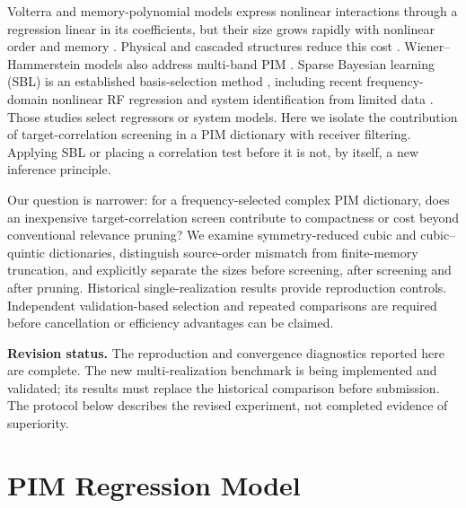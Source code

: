 \documentclass[conference]{IEEEtran}
\begin{document}
Volterra and memory-polynomial models express nonlinear interactions through a regression linear in its coefficients, but their size grows rapidly with nonlinear order and memory \cite{Schetzen1980Volterra,Morgan2006GMP,Waheed2020PIM}. Physical and cascaded structures reduce this cost \cite{Lampu2023Cascade}. Wiener--Hammerstein models also address multi-band PIM \cite{Liu2024MultiBand}. Sparse Bayesian learning (SBL) is an established basis-selection method \cite{Tipping2001SBL,Wipf2004SBL}, including recent frequency-domain nonlinear RF regression \cite{Crespo2025SparseRF} and system identification from limited data \cite{Wei2025Identification}. Those studies select regressors or system models. Here we isolate the contribution of target-correlation screening in a PIM dictionary with receiver filtering. Applying SBL or placing a correlation test before it is not, by itself, a new inference principle.

Our question is narrower: for a frequency-selected complex PIM dictionary, does an inexpensive target-correlation screen contribute to compactness or cost beyond conventional relevance pruning? We examine symmetry-reduced cubic and cubic--quintic dictionaries, distinguish source-order mismatch from finite-memory truncation, and explicitly separate the sizes before screening, after screening and after pruning. Historical single-realization results provide reproduction controls. Independent validation-based selection and repeated comparisons are required before cancellation or efficiency advantages can be claimed.

\noindent\textbf{Revision status.} The reproduction and convergence diagnostics reported here are complete. The new multi-realization benchmark is being implemented and validated; its results must replace the historical comparison before submission. The protocol below describes the revised experiment, not completed evidence of superiority.

\section{PIM Regression Model}
\label{sec:model}
\end{document}
